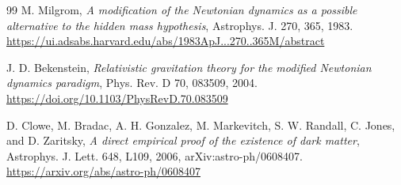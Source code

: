 \documentclass[11pt]{article}
\begin{document}
\begin{thebibliography}{99}
M. Milgrom,
\emph{A modification of the Newtonian dynamics as a possible alternative to the hidden mass hypothesis},
Astrophys. J. 270, 365, 1983.
\url{https://ui.adsabs.harvard.edu/abs/1983ApJ...270..365M/abstract}

J. D. Bekenstein,
\emph{Relativistic gravitation theory for the modified Newtonian dynamics paradigm},
Phys. Rev. D 70, 083509, 2004.
\url{https://doi.org/10.1103/PhysRevD.70.083509}

D. Clowe, M. Bradac, A. H. Gonzalez, M. Markevitch, S. W. Randall,
C. Jones, and D. Zaritsky,
\emph{A direct empirical proof of the existence of dark matter},
Astrophys. J. Lett. 648, L109, 2006, arXiv:astro-ph/0608407.
\url{https://arxiv.org/abs/astro-ph/0608407}

\end{thebibliography}
\end{document}
